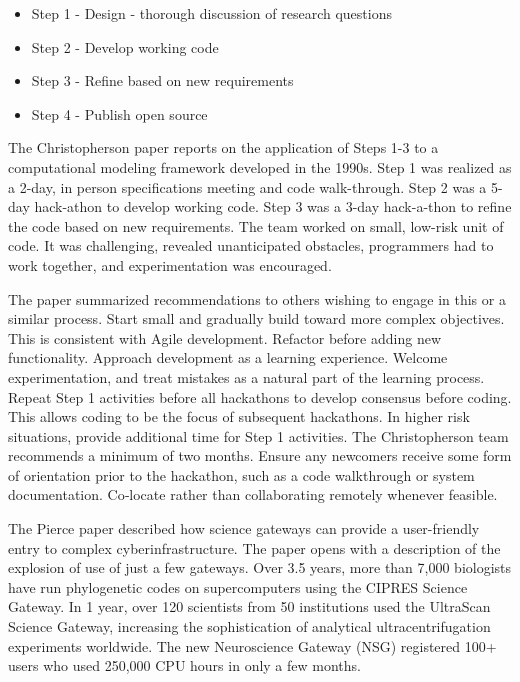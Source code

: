 \documentclass[11pt, oneside]{amsart}
\begin{document}
\begin{itemize}

\item Step 1 - Design - thorough discussion of research questions
\item Step 2 - Develop working code
\item Step 3 - Refine based on new requirements
\item Step 4 - Publish open source

\end{itemize}

The Christopherson paper reports on the application of Steps 1-3 to a computational modeling framework developed in the 1990s.
Step 1 was realized as a 2-day, in person specifications meeting and code walk-through. Step 2 was a 5-day hack-athon to develop working code.
Step 3 was a 3-day hack-a-thon to refine the code based on new requirements. The team worked on small, low-risk unit of 
code. It was challenging, revealed unanticipated obstacles, programmers had to work together, and experimentation was encouraged.

The paper summarized recommendations to others wishing to engage in this or a similar process. Start small and gradually 
build toward more complex objectives. This is consistent with Agile development. Refactor before adding new functionality.
Approach development as a learning experience. Welcome experimentation, and treat mistakes as a natural part of the learning process.
Repeat Step 1 activities before all hackathons to develop consensus before coding. This allows coding to be the focus of subsequent hackathons. 
In higher risk situations, provide additional time for Step 1 activities. The Christopherson team recommends a minimum of two months.
Ensure any newcomers receive some form of orientation prior to the hackathon, such as a code walkthrough or system documentation.
Co‐locate rather than collaborating remotely whenever feasible.

The Pierce paper described how science gateways can provide a user-friendly entry to complex cyberinfrastructure. The paper opens with a description of the explosion of use of just a few gateways. 
Over 3.5 years, more than 7,000 biologists have run phylogenetic codes on supercomputers using the CIPRES Science Gateway. In 1 year, over 120 scientists from 50 institutions used the UltraScan Science Gateway, 
increasing the sophistication of analytical ultracentrifugation experiments worldwide. The new Neuroscience Gateway (NSG) registered 100+ 
users who used 250,000 CPU hours in only a few months.
\end{document}
